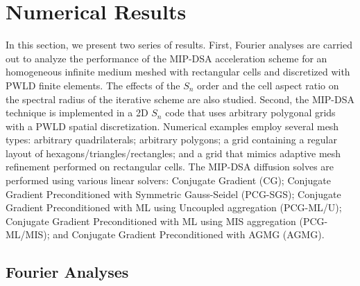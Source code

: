 \documentclass[preprint,10pt]{elsarticle}
\renewcommand{\(}{\left(}
\renewcommand{\)}{\right)}
\renewcommand{\[}{\left[}
\renewcommand{\]}{\right]}
\newcommand{\sn}{\ensuremath{S_n}\xspace}
\begin{document}

\section{Numerical Results} \label{sec_res}

In this section, we present two series of results. First, Fourier analyses are 
carried out to analyze the performance of the MIP-DSA acceleration scheme 
for an homogeneous infinite medium meshed with rectangular cells and discretized with PWLD finite elements.
The effects of the $S_n$ order and the cell aspect ratio on the spectral radius of the iterative 
scheme are also studied. Second, the MIP-DSA technique is implemented in a 2D \sn code that uses
arbitrary polygonal grids with a PWLD spatial discretization.  Numerical examples employ
several mesh types: arbitrary quadrilaterals; arbitrary polygons; a grid containing a regular layout of 
hexagons/triangles/rectangles; and a grid that mimics adaptive mesh refinement 
performed on rectangular cells. The MIP-DSA diffusion solves are performed using various
linear solvers: Conjugate Gradient (CG); Conjugate Gradient
Preconditioned with Symmetric Gauss-Seidel (PCG-SGS); Conjugate Gradient
Preconditioned with ML using Uncoupled aggregation (PCG-ML/U);
Conjugate Gradient Preconditioned with ML using MIS aggregation (PCG-ML/MIS);
and Conjugate Gradient Preconditioned with AGMG (AGMG). 

\subsection{Fourier Analyses}
\end{document}
